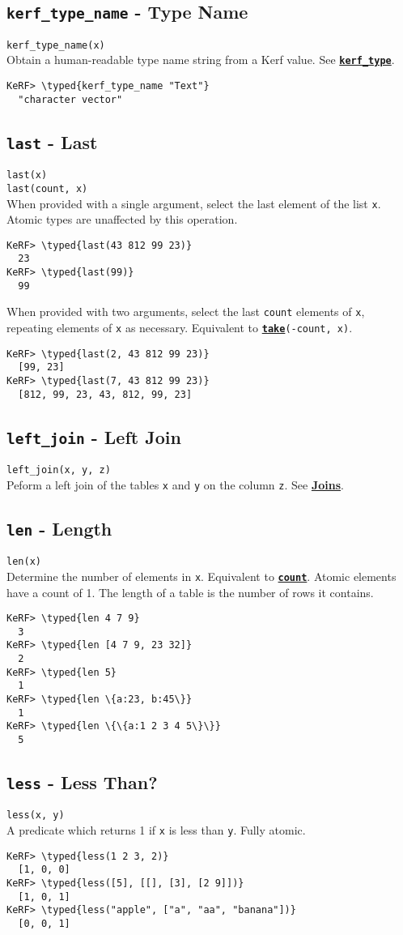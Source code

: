 \documentclass{article}
\newcommand{\typed}[1]{\textcolor{TealBlue}{#1}}
\newcommand{\primdefu}[3]{\subsection{\texttt{#1} - #2}\label{prim:#3}}
\newcommand{\primu}[2]{\hyperref[prim:#2]{\textbf{\texttt{#1}}}}
\newcommand{\primdef}[2]{\primdefu{#1}{#2}{#1}}
\newcommand{\prim}[1]{\primu{#1}{#1}}
\begin{document}
\primdefu{kerf\_type\_name}{Type Name}{kerfTypeName}
\texttt{kerf\_type\_name(x)}\\

Obtain a human-readable type name string from a Kerf value. See \primu{kerf\_type}{kerfType}.
\begin{Verbatim}
KeRF> \typed{kerf_type_name "Text"}
  "character vector"
\end{Verbatim}

\primdef{last}{Last}
\texttt{last(x)}\\
\texttt{last(count, x)}\\

When provided with a single argument, select the last element of the list \texttt{x}. Atomic types are unaffected by this operation.
\begin{Verbatim}
KeRF> \typed{last(43 812 99 23)}
  23
KeRF> \typed{last(99)}
  99
\end{Verbatim}

When provided with two arguments, select the last \texttt{count} elements of \texttt{x}, repeating elements of \texttt{x} as necessary. Equivalent to \texttt{\prim{take}(-count, x)}.
\begin{Verbatim}
KeRF> \typed{last(2, 43 812 99 23)}
  [99, 23]
KeRF> \typed{last(7, 43 812 99 23)}
  [812, 99, 23, 43, 812, 99, 23]
\end{Verbatim}

\primdefu{left\_join}{Left Join}{leftJoin}
\texttt{left\_join(x, y, z)}\\

Peform a left join of the tables \texttt{x} and \texttt{y} on the column \texttt{z}. See \hyperref[sec:joins]{\textbf{Joins}}.

\primdef{len}{Length}
\texttt{len(x)}\\

Determine the number of elements in \texttt{x}. Equivalent to \prim{count}. Atomic elements have a count of 1. The length of a table is the number of rows it contains.
\begin{Verbatim}
KeRF> \typed{len 4 7 9}
  3
KeRF> \typed{len [4 7 9, 23 32]}
  2
KeRF> \typed{len 5}
  1
KeRF> \typed{len \{a:23, b:45\}}
  1
KeRF> \typed{len \{\{a:1 2 3 4 5\}\}}
  5
\end{Verbatim}

\primdef{less}{Less Than?}
\texttt{less(x, y)}\\

A predicate which returns 1 if \texttt{x} is less than \texttt{y}. Fully atomic.
\begin{Verbatim}
KeRF> \typed{less(1 2 3, 2)}
  [1, 0, 0]
KeRF> \typed{less([5], [[], [3], [2 9]])}
  [1, 0, 1]
KeRF> \typed{less("apple", ["a", "aa", "banana"])}
  [0, 0, 1]
\end{Verbatim}
\end{document}
